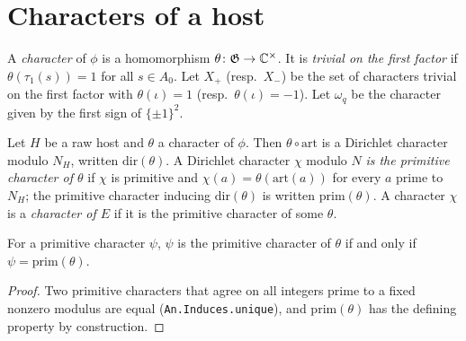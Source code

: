 \section{Characters of a host}

\begin{definition}\label{host:chars}
A \emph{character} of $\phi$ is a homomorphism $\theta\colon\mathfrak
G\to\mathbb{C}^{\times}$. It is \emph{trivial on the first factor} if
$\theta(\tau_1(s))=1$ for all $s\in A_0$. Let $X_+$ (resp.\ $X_-$) be the
set of characters trivial on the first factor with $\theta(\iota)=1$
(resp.\ $\theta(\iota)=-1$). Let $\omega_q$ be the character given by the
first sign of $\{\pm1\}^2$.
\end{definition}

\begin{definition}\label{host:dir}
Let $H$ be a raw host and $\theta$ a character of $\phi$. Then
$\theta\circ\mathrm{art}$ is a Dirichlet character modulo $N_H$, written
$\mathrm{dir}(\theta)$. A Dirichlet character $\chi$ modulo $N$ \emph{is
the primitive character of $\theta$} if $\chi$ is primitive and
$\chi(a)=\theta(\mathrm{art}(a))$ for every $a$ prime to $N_H$; the
primitive character inducing $\mathrm{dir}(\theta)$ is written
$\mathrm{prim}(\theta)$. A character $\chi$ is a \emph{character of $E$} if
it is the primitive character of some $\theta$.
\end{definition}

\begin{lemma}\label{host:prim-unique}
For a primitive character $\psi$, $\psi$ is the primitive character of
$\theta$ if and only if $\psi=\mathrm{prim}(\theta)$.
\end{lemma}
\begin{proof}
Two primitive characters that agree on all integers prime to a fixed
nonzero modulus are equal (\texttt{An.Induces.unique}), and
$\mathrm{prim}(\theta)$ has the defining property by construction.
\end{proof}

